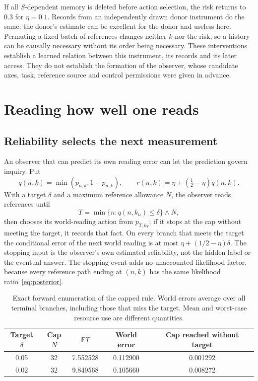 \documentclass[11pt,a4paper]{article}
\newcommand{\E}{\mathbb E}
\begin{document}
If all $S$-dependent memory is deleted before action selection, the risk returns to $0.3$ for $\eta=0.1$. Records from an independently drawn donor instrument do the same: the donor's estimate can be excellent for the donor and useless here. Permuting a fixed batch of references changes neither $k$ nor the risk, so a history can be causally necessary without its order being necessary. These interventions establish a learned relation between this instrument, its records and its later access. They do not establish the formation of the observer, whose candidate axes, task, reference source and control permissions were given in advance.

\section{Reading how well one reads}\label{sec:selfevaluation}

\subsection{Reliability selects the next measurement}

An observer that can predict its own reading error can let the prediction govern inquiry. Put
\[
 q(n,k)=\min(p_{n,k},1-p_{n,k}),\qquad
 r(n,k)=\eta+(\tfrac12-\eta)q(n,k).
\]
With a target $\delta$ and a maximum reference allowance $N$, the observer reads references until
\begin{equation}\label{eq:stop}
 T=\min\{n:q(n,k_n)\le\delta\}\wedge N,
\end{equation}
then chooses its world-reading action from $p_{T,k_T}$; if it stops at the cap without meeting the target, it records that fact. On every branch that meets the target the conditional error of the next world reading is at most $\eta+(1/2-\eta)\delta$. The stopping input is the observer's own estimated reliability, not the hidden label or the eventual answer. The stopping event adds no unaccounted likelihood factor, because every reference path ending at $(n,k)$ has the same likelihood ratio~\eqref{eq:posterior}.

\begin{table}[ht]
\centering
\begin{tabular}{ccccc}
\toprule
Target $\delta$ & Cap $N$ & $\E T$ & World error & Cap reached without target\\
\midrule
0.05 & 32 & 7.552528 & 0.112900 & 0.001292\\
0.02 & 32 & 9.849568 & 0.105660 & 0.008272\\
\bottomrule
\end{tabular}
\caption{Exact forward enumeration of the capped rule. World errors average over all terminal branches, including those that miss the target. Mean and worst-case resource use are different quantities.}
\label{tab:sequential}
\end{table}
\end{document}
